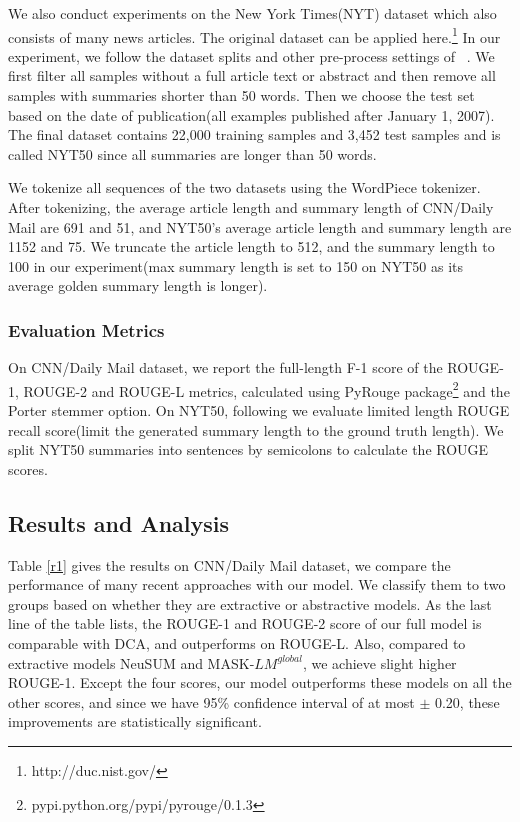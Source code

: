 \documentclass{article}
\begin{document}
We also conduct experiments on the New York Times(NYT) dataset which also consists of many news articles. The original dataset can be applied here.\footnote{http://duc.nist.gov/} In our experiment, we follow the dataset splits and other pre-process settings of ~\cite{Durrett2016}.  We first filter all samples without a full article text or abstract and then remove all samples with summaries shorter than 50 words. Then we choose the test set based on the date of publication(all examples published after January 1, 2007). The final dataset contains 22,000 training samples and 3,452 test samples and is called NYT50 since all summaries are longer than 50 words.

We tokenize all sequences of the two datasets using the WordPiece tokenizer. After tokenizing, the average article length and summary length of CNN/Daily Mail are 691 and 51, and NYT50's average article length and summary length are 1152 and 75. We truncate the article length to 512, and the summary length to 100 in our experiment(max summary length is set to 150 on NYT50 as its average golden summary length is longer).


\subsubsection{Evaluation Metrics}
On CNN/Daily Mail dataset, we report the full-length F-1 score of the ROUGE-1, ROUGE-2 and ROUGE-L metrics, calculated using PyRouge package\footnote{pypi.python.org/pypi/pyrouge/0.1.3} and the Porter stemmer option. On NYT50, following \cite{Paulus2018} we evaluate limited length ROUGE recall score(limit the generated summary length to the ground truth length). We split NYT50 summaries into sentences by semicolons to calculate the ROUGE scores.


\subsection{Results and Analysis}

Table \ref{r1} gives the results on CNN/Daily Mail dataset, we compare the performance of many recent approaches with our model. We classify them to two groups based on whether they are extractive or abstractive models. As the last line of the table lists, the ROUGE-1 and ROUGE-2 score of our full model is comparable with DCA, and outperforms on ROUGE-L. Also, compared to extractive models NeuSUM and MASK-$LM^{global}$, we achieve slight higher ROUGE-1.
Except the four scores, our model outperforms these models on all the other scores, and since we have 95\% confidence interval of at most $\pm$ 0.20, these improvements are statistically significant.
\end{document}
